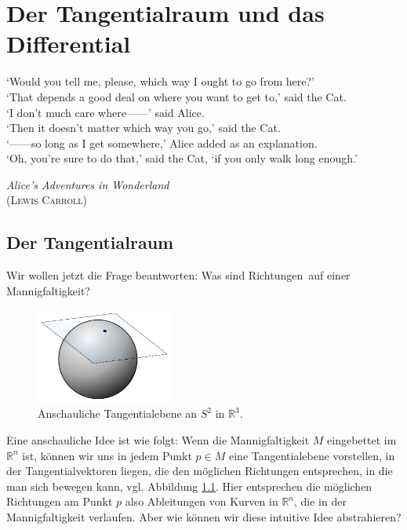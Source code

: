 \documentclass[a4paper]{scrbook}
\numberwithin{equation}{chapter}
\newcommand{\R}{\mathbb{R}}
\theoremstyle{definition}
\begin{document}
\chapter{Der Tangentialraum und das Differential}
\epigraph{`Would you tell me, please, which way I ought to go from here?'\\
	`That depends a good deal on where you want to get to,' said the Cat.\\
	`I don't much care where------' said Alice.\\
	`Then it doesn't matter which way you go,' said the Cat.\\
	`------so long as I get somewhere,' Alice added as an explanation.\\
	`Oh, you're sure to do that,' said the Cat, `if you only walk long enough.'}
{\emph{Alice's Adventures in Wonderland}\\(\textsc{Lewis Carroll})}

\section{Der Tangentialraum}
Wir wollen jetzt die Frage beantworten: Was sind \glqq Richtungen\grqq\ auf einer Mannigfaltigkeit?

\begin{figure} \label{fig:tngt_plane}
	\centering
	\includegraphics[width=0.4\textwidth]{Image_Tangent-plane}
	\caption{Anschauliche Tangentialebene an $S^2$ in $\R^3$.}
\end{figure}

Eine anschauliche Idee ist wie folgt: Wenn die Mannigfaltigkeit $M$ eingebettet im $\mathbb R^n$ ist, können wir uns in jedem Punkt $p \in M$ eine Tangentialebene vorstellen, in der Tangentialvektoren liegen, die den möglichen Richtungen entsprechen, in die man sich bewegen kann, vgl. Abbildung \ref{fig:tngt_plane}. Hier entsprechen die möglichen Richtungen am Punkt $p$ also Ableitungen von Kurven in $\R^n$, die in der Mannigfaltigkeit verlaufen. Aber wie können wir diese intuitive Idee abstrahieren?
\end{document}
